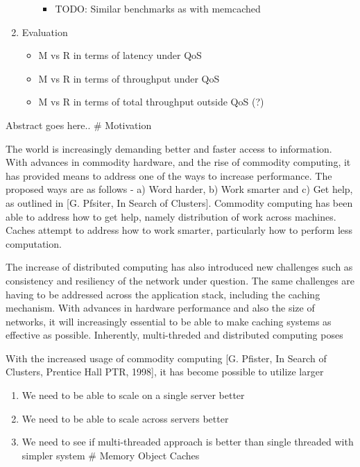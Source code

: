 \begin{enumerate}
\begin{itemize}
    \begin{itemize}
    \tightlist
    \item
      TODO: Similar benchmarks as with memcached
    \end{itemize}
  \end{itemize}
\item
  Evaluation

  \begin{itemize}
  \tightlist
  \item
    M vs R in terms of latency under QoS
  \item
    M vs R in terms of throughput under QoS
  \item
    M vs R in terms of total throughput outside QoS (?)
  \end{itemize}
\end{enumerate}

Abstract goes here.. \# Motivation

The world is increasingly demanding better and faster access to
information. With advances in commodity hardware, and the rise of
commodity computing, it has provided means to address one of the ways to
increase performance. The proposed ways are as follows - a) Word harder,
b) Work smarter and c) Get help, as outlined in {[}G. Pfsiter, In Search
of Clusters{]}. Commodity computing has been able to address how to get
help, namely distribution of work across machines. Caches attempt to
address how to work smarter, particularly how to perform less
computation.

The increase of distributed computing has also introduced new challenges
such as consistency and resiliency of the network under question. The
same challenges are having to be addressed across the application stack,
including the caching mechanism. With advances in hardware performance
and also the size of networks, it will increasingly essential to be able
to make caching systems as effective as possible. Inherently,
multi-threded and distributed computing poses

With the increased usage of commodity computing {[}G. Pfister, In Search
of Clusters, Prentice Hall PTR, 1998{]}, it has become possible to
utilize larger

\begin{enumerate}
\def\labelenumi{\arabic{enumi}.}
\tightlist
\item
  We need to be able to scale on a single server better
\item
  We need to be able to scale across servers better
\item
  We need to see if multi-threaded approach is better than single
  threaded with simpler system \# Memory Object Caches
\end{enumerate}

